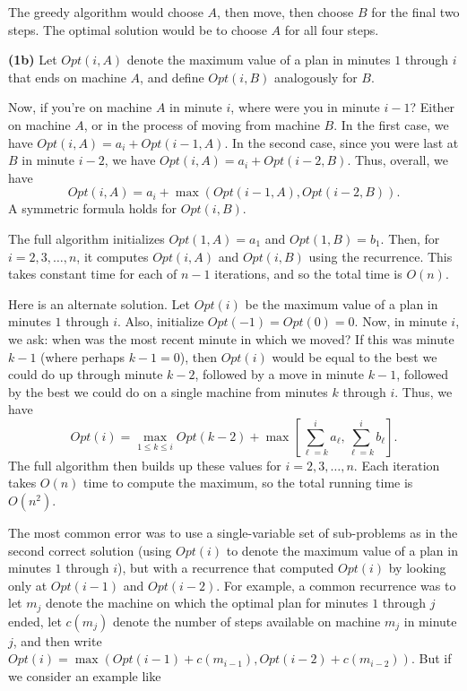 \documentclass[12pt]{article}
\begin{document}
\begin{enumerate}
{The greedy algorithm would choose $A$, then move, 
then choose $B$ for the final two steps.
The optimal solution would be to choose $A$ for
all four steps.

\medskip

{\bf (1b)} 
Let $Opt(i,A)$ denote the maximum value of a plan in minutes
$1$ through $i$ that ends on machine $A$,
and define $Opt(i,B)$ analogously for $B$.

Now, if you're on machine $A$ in minute $i$, where
were you in minute $i-1$?
Either on machine $A$, or in the process of moving from machine $B$.
In the first case, we have
$Opt(i,A) = a_i + Opt(i-1,A)$.
In the second case, since you were last at $B$ in minute $i-2$, we have
$Opt(i,A) = a_i + Opt(i-2,B)$.
Thus, overall, we have
$$Opt(i,A) = a_i + \max(Opt(i-1,A), Opt(i-2,B)).$$
A symmetric formula holds for $Opt(i,B)$.

The full algorithm initializes $Opt(1,A) = a_1$ and $Opt(1,B) = b_1$.
Then, for $i = 2, 3, \ldots, n$, it computes 
$Opt(i,A)$ and $Opt(i,B)$ using the recurrence.
This takes constant time for each of $n-1$ iterations,
and so the total time is $O(n)$.

Here is an alternate solution. 
Let $Opt(i)$ be the maximum value 
of a plan in minutes $1$ through $i$.
Also, initialize $Opt(-1) = Opt(0) = 0$.
Now, in minute $i$, we ask: when was the most recent minute 
in which we moved?
If this was minute $k-1$ (where perhaps $k-1 = 0$),
then $Opt(i)$ would be equal to the best we could do
up through minute $k-2$, followed by a move in minute $k-1$,
followed by the best we could do on a single machine from
minutes $k$ through $i$.  
Thus, we have 
$$Opt(i) = \max_{1 \leq k \leq i} Opt(k-2) + 
\max\left[\sum_{\ell=k}^i a_\ell , \sum_{\ell=k}^i b_\ell\right].$$
The full algorithm then builds up these values 
for $i = 2, 3, \ldots, n$.
Each iteration takes $O(n)$ time to compute the maximum,
so the total running time is $O(n^2)$.

\medskip
The most common error was to use a single-variable set of
sub-problems as in the second correct solution 
(using $Opt(i)$ to denote the maximum value
of a plan in minutes $1$ through $i$),
but with a recurrence that computed $Opt(i)$ by
looking only at $Opt(i-1)$ and $Opt(i-2)$.
For example, a common recurrence was to let $m_j$
denote the machine on which the optimal plan
for minutes $1$ through $j$ ended,
let $c(m_j)$ denote the number of steps
available on machine $m_j$ in minute $j$,
and then write
$Opt(i) = \max(Opt(i-1) + c(m_{i-1}), Opt(i-2) + c(m_{i-2}))$.
But if we consider an example like

}
\end{enumerate}
\end{document}
